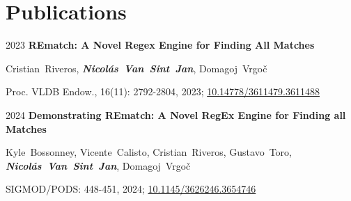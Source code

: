 \section{Publications}

\begin{samepage}
    \begin{twocolentry}{
        2023
    }
        \textbf{REmatch: A Novel Regex Engine for Finding All Matches}
    \end{twocolentry}

    \vspace{0.10 cm}
    
    \begin{onecolentry}
        \mbox{Cristian Riveros}, \mbox{\textbf{\textit{Nicolás Van Sint Jan}}}, \mbox{Domagoj Vrgoč}

        \vspace{0.10 cm}

        Proc. VLDB Endow., 16(11): 2792-2804, 2023; \href{https://doi.org/10.14778/3611479.3611488}{10.14778/3611479.3611488}
    \end{onecolentry}

    \vspace{0.2 cm}

    \begin{twocolentry}{
        2024
    }
        \textbf{Demonstrating REmatch: A Novel RegEx Engine for Finding all Matches}
    \end{twocolentry}

    \vspace{0.10 cm}
    
    \begin{onecolentry}
        \mbox{Kyle Bossonney}, \mbox{Vicente Calisto}, \mbox{Cristian Riveros}, \mbox{Gustavo Toro}, \mbox{\textbf{\textit{Nicolás Van Sint Jan}}}, \mbox{Domagoj Vrgoč}

        \vspace{0.10 cm}

        SIGMOD/PODS: 448-451, 2024; \href{https://doi.org/10.1145/3626246.3654746}{10.1145/3626246.3654746}
    \end{onecolentry}
\end{samepage} 